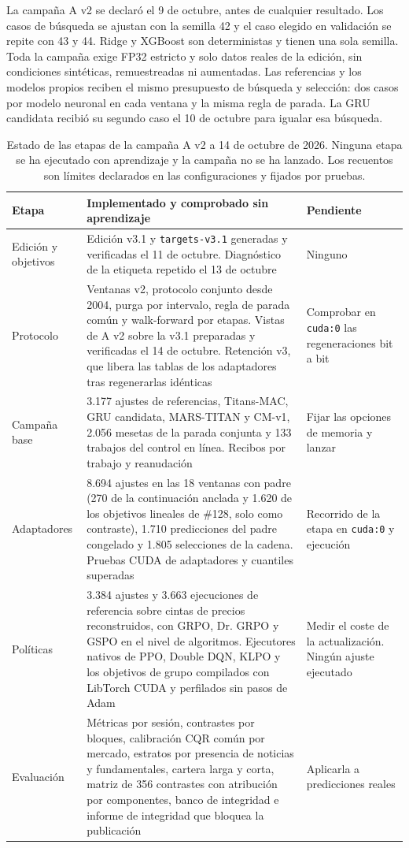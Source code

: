 \documentclass[11pt,a4paper]{report}
\begin{document}
La campaña A v2 se declaró el 9 de octubre, antes de cualquier resultado. Los
casos de búsqueda se ajustan con la semilla 42 y el caso elegido en validación
se repite con 43 y 44. Ridge y XGBoost son deterministas y tienen una sola
semilla. Toda la campaña exige FP32 estricto y solo datos reales de la
edición, sin condiciones sintéticas, remuestreadas ni aumentadas. Las
referencias y los modelos propios reciben el mismo presupuesto de búsqueda y
selección: dos casos por modelo neuronal en cada ventana y la misma regla de
parada. La GRU candidata recibió su segundo caso el 10 de octubre para igualar
esa búsqueda.

\begin{table}[htbp]
\centering
\small
\caption{Estado de las etapas de la campaña A v2 a 14 de octubre de 2026.
Ninguna etapa se ha ejecutado con aprendizaje y la campaña no se ha lanzado.
Los recuentos son límites declarados en las configuraciones y fijados por
pruebas.}
\label{tab:estado}
\begin{tabular}{p{2.6cm}p{5.6cm}p{4.8cm}}
\toprule
Etapa & Implementado y comprobado sin aprendizaje & Pendiente \\
\midrule
Edición y objetivos & Edición v3.1 y \texttt{targets-v3.1} generadas y
verificadas el 11 de octubre. Diagnóstico de la etiqueta repetido el 13 de
octubre & Ninguno \\
Protocolo & Ventanas v2, protocolo conjunto desde 2004, purga por intervalo,
regla de parada común y walk-forward por etapas. Vistas de A v2 sobre la v3.1
preparadas y verificadas el 14 de octubre. Retención v3, que libera las tablas
de los adaptadores tras regenerarlas idénticas & Comprobar en \texttt{cuda:0}
las regeneraciones bit a bit \\
Campaña base & 3.177 ajustes de referencias, Titans-MAC, GRU candidata,
MARS-TITAN y CM-v1, 2.056 mesetas de la parada conjunta y 133 trabajos del
control en línea. Recibos por trabajo y reanudación & Fijar las opciones de memoria y lanzar \\
Adaptadores & 8.694 ajustes en las 18 ventanas con padre (270 de la continuación
anclada y 1.620 de los objetivos lineales de \#128, solo como contraste), 1.710 predicciones
del padre congelado y 1.805 selecciones de la cadena. Pruebas CUDA de
adaptadores y cuantiles superadas & Recorrido de la etapa en \texttt{cuda:0} y
ejecución \\
Políticas & 3.384 ajustes y 3.663 ejecuciones de referencia sobre cintas de
precios reconstruidos, con GRPO, Dr. GRPO y GSPO en el nivel de algoritmos.
Ejecutores nativos de PPO, Double DQN, KLPO y los objetivos de grupo compilados
con LibTorch CUDA y perfilados sin pasos de Adam & Medir el coste de la
actualización. Ningún ajuste ejecutado \\
Evaluación & Métricas por sesión, contrastes por bloques, calibración CQR
común por mercado, estratos por presencia de noticias y fundamentales, cartera
larga y corta, matriz de 356 contrastes con atribución por componentes, banco
de integridad e informe de integridad que bloquea la publicación & Aplicarla a
predicciones reales \\
\bottomrule
\end{tabular}
\end{table}
\end{document}
